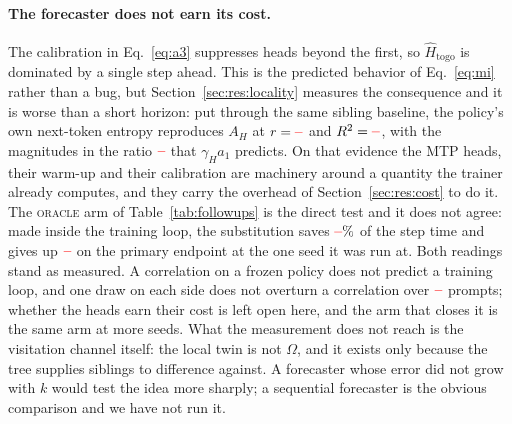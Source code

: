 \documentclass[11pt]{article}
\newcommand{\AH}{A_{H}}
\newcommand{\Om}{\Omega}
\providecommand{\PENDING}{\textcolor{red}{\textbf{--}}}
\newcommand{\num}[1]{\ifcsname #1\endcsname\csname #1\endcsname\else\PENDING\fi}
\begin{document}
\paragraph{The forecaster does not earn its cost.}
The calibration in Eq.~\eqref{eq:a3} suppresses heads beyond the first, so
$\hat{H}_{\mathrm{togo}}$ is dominated by a single step ahead. This is the predicted
behavior of Eq.~\eqref{eq:mi} rather than a bug, but
Section~\ref{sec:res:locality} measures the consequence and it is worse than a
short horizon: put through the same sibling baseline, the policy's own
next-token entropy reproduces $\AH$ at $r = \num{Locadv}$ and
$R^2 = \num{Locrsq}$, with the magnitudes in the ratio $\num{Locratio}$ that
$\gamma_H a_1$ predicts. On that evidence the MTP heads, their warm-up and
their calibration are machinery around a quantity the trainer already computes,
and they carry the overhead of Section~\ref{sec:res:cost} to do it. The
\textsc{oracle} arm of Table~\ref{tab:followups} is the direct test and it does not
agree: made inside the training loop, the substitution saves
$\num{Fsignedoraclesaving}\%$ of the step time and gives up
$\num{Fsignedoracleacc}$ on the primary endpoint at the one seed it was run at. Both
readings stand as measured. A correlation on a frozen policy does not predict a
training loop, and one draw on each side does not overturn a correlation over
$\num{Locgroups}$ prompts; whether the heads earn their cost is left open here, and
the arm that closes it is the same arm at more seeds. What
the measurement does not reach is the visitation channel itself: the local twin
is not $\Om$, and it exists only because the tree supplies siblings to
difference against. A forecaster whose error did not grow with $k$ would test
the idea more sharply; a sequential forecaster is the obvious comparison and we
have not run it.
\end{document}
